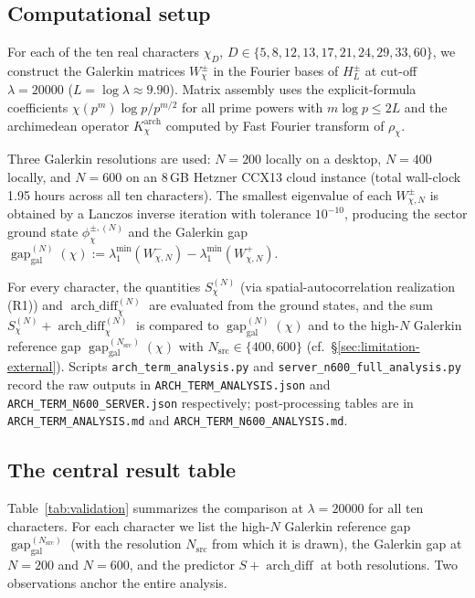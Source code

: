 \documentclass[a4paper,10pt,twocolumn]{article}
\theoremstyle{definition}
\theoremstyle{remark}
\newcommand{\gap}{\operatorname{gap}}
\newcommand{\chifn}{\chi}
\newcommand{\archdiff}{\operatorname{arch\_diff}}
\begin{document}
\subsection{Computational setup}
\label{sec:validation-setup}

For each of the ten real characters $\chifn_D$,
$D\in\{5,8,12,13,17,21,24,29,33,60\}$, we construct the Galerkin
matrices
$W^\pm_{\chifn}$ in the Fourier bases of $H_L^\pm$ at cut-off
$\lambda=20000$ ($L=\log\lambda\approx 9.90$). Matrix assembly uses the
explicit-formula coefficients $\chifn(p^m)\log p/p^{m/2}$ for all
prime powers with $m\log p\leq 2L$ and the archimedean operator
$K^{\mathrm{arch}}_{\chifn}$ computed by Fast Fourier transform of
$\rho_{\chifn}$.

Three Galerkin resolutions are used: $N=200$ locally on a desktop,
$N=400$ locally, and $N=600$ on an 8\,GB Hetzner CCX13 cloud
instance (total wall-clock 1.95 hours across all ten characters). The
smallest eigenvalue of each $W^\pm_{\chifn,N}$ is obtained by a
Lanczos inverse iteration with tolerance $10^{-10}$, producing the
sector ground state $\phi^{\pm,(N)}_{\chifn}$ and the Galerkin gap
$\gap_{\mathrm{gal}}^{(N)}(\chifn)
:=\lambda_1^{\min}(W^-_{\chifn,N})-\lambda_1^{\min}(W^+_{\chifn,N})$.

For every character, the quantities $S_{\chifn}^{(N)}$ (via
spatial-autocorrelation realization (R1)) and
$\archdiff_{\chifn}^{(N)}$ are evaluated from the ground states, and
the sum $S_{\chifn}^{(N)}+\archdiff_{\chifn}^{(N)}$ is compared to
$\gap_{\mathrm{gal}}^{(N)}(\chifn)$ and to the high-$N$ Galerkin
reference gap $\gap_{\mathrm{gal}}^{(N_{\mathrm{src}})}(\chifn)$ with
$N_{\mathrm{src}}\in\{400,600\}$ (cf.\ \S\ref{sec:limitation-external}). Scripts
\texttt{arch\_term\_analysis.py} and
\texttt{server\_n600\_full\_analysis.py} record the raw outputs in
\texttt{ARCH\_TERM\_ANALYSIS.json} and
\texttt{ARCH\_TERM\_N600\_SERVER.json} respectively; post-processing
tables are in \texttt{ARCH\_TERM\_ANALYSIS.md} and
\texttt{ARCH\_TERM\_N600\_ANALYSIS.md}.

\subsection{The central result table}
\label{sec:validation-table}

Table~\ref{tab:validation} summarizes the comparison at $\lambda=
20000$ for all ten characters. For each character we list the
high-$N$ Galerkin reference gap
$\gap_{\mathrm{gal}}^{(N_{\mathrm{src}})}$ (with the resolution
$N_{\mathrm{src}}$ from which it is drawn), the Galerkin gap at
$N=200$ and $N=600$, and the predictor $S+\archdiff$ at both
resolutions. Two observations anchor the entire analysis.
\end{document}
